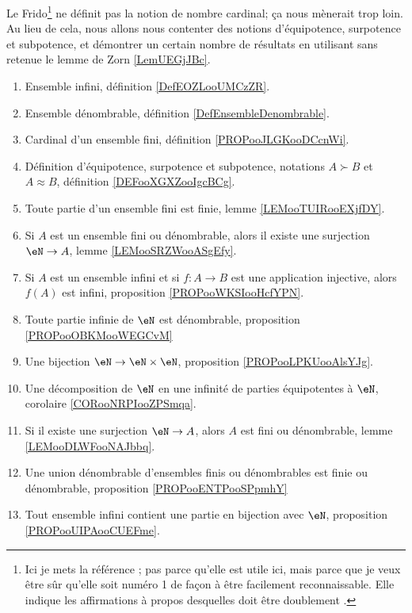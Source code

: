 Le Frido\footnote{Ici je mets la référence \cite{MonCerveau}; pas parce qu'elle est utile ici, mais parce que je veux être sûr qu'elle soit numéro 1 de façon à être facilement reconnaissable. Elle indique les affirmations à propos desquelles  doit être doublement .} ne définit pas la notion de nombre cardinal; ça nous mènerait trop loin. Au lieu de cela, nous allons nous contenter des notions d'équipotence, surpotence et subpotence, et démontrer un certain nombre de résultats en utilisant sans retenue le lemme de Zorn \ref{LemUEGjJBc}.
\begin{enumerate}
	\item
	      Ensemble infini, définition \ref{DefEOZLooUMCzZR}.
	\item
	      Ensemble dénombrable, définition \ref{DefEnsembleDenombrable}.
	\item
	      Cardinal d'un ensemble fini, définition \ref{PROPooJLGKooDCcnWi}.
	\item
	      Définition d'équipotence, surpotence et subpotence, notations \( A\succ B\) et \( A\approx B\), définition \ref{DEFooXGXZooIgcBCg}.
	\item
	      Toute partie d'un ensemble fini est finie, lemme \ref{LEMooTUIRooEXjfDY}.
	\item
	      Si \( A\) est un ensemble fini ou dénombrable, alors il existe une surjection \( \eN\to A\), lemme \ref{LEMooSRZWooASgEfy}.
	\item
	      Si \( A\) est un ensemble infini et si \( f\colon A\to B\) est une application injective, alors \( f(A)\) est infini, proposition \ref{PROPooWKSIooHcfYPN}.
	\item
	      Toute partie infinie de \( \eN\) est dénombrable, proposition \ref{PROPooOBKMooWEGCvM}
	\item
	      Une bijection \( \eN\to \eN\times \eN\), proposition \ref{PROPooLPKUooAlsYJg}.
	\item
	      Une décomposition de \( \eN\) en une infinité de parties équipotentes à \( \eN\), corolaire \ref{CORooNRPIooZPSmqa}.
	\item
	      Si il existe une surjection \( \eN\to A\), alors \( A\) est fini ou dénombrable, lemme \ref{LEMooDLWFooNAJbbq}.
	\item
	      Une union dénombrable d'ensembles finis ou dénombrables est finie ou dénombrable, proposition \ref{PROPooENTPooSPpmhY}
	\item
	      Tout ensemble infini contient une partie en bijection avec \( \eN\), proposition \ref{PROPooUIPAooCUEFme}.

\end{enumerate}
